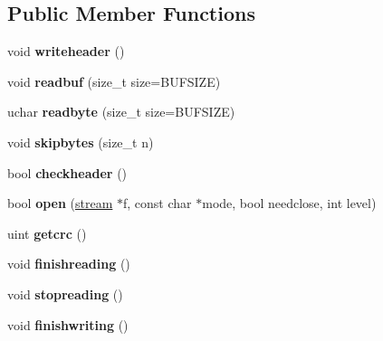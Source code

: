 \subsection*{Public Member Functions}
\begin{DoxyCompactItemize}
\item 
\mbox{\label{structgzstream_a6d191853a1c4c8bf6cccbab9c8e0309a}} 
void {\bfseries writeheader} ()
\item 
\mbox{\label{structgzstream_a8d0344b10ddf5d5f027f845b25a5d7b7}} 
void {\bfseries readbuf} (size\+\_\+t size=B\+U\+F\+S\+I\+ZE)
\item 
\mbox{\label{structgzstream_a4da22015c7effe15411cec2f24dea196}} 
uchar {\bfseries readbyte} (size\+\_\+t size=B\+U\+F\+S\+I\+ZE)
\item 
\mbox{\label{structgzstream_a03650110ed9c2b4d0b055347fa2597c9}} 
void {\bfseries skipbytes} (size\+\_\+t n)
\item 
\mbox{\label{structgzstream_a68b93da33e4709a1fd002542a78fc944}} 
bool {\bfseries checkheader} ()
\item 
\mbox{\label{structgzstream_a68ed86a7e5317f5e78ab711792a03d2c}} 
bool {\bfseries open} (\hyperlink{structstream}{stream} $\ast$f, const char $\ast$mode, bool needclose, int level)
\item 
\mbox{\label{structgzstream_a1dbc14c5f33576998da060e4deb20d61}} 
uint {\bfseries getcrc} ()
\item 
\mbox{\label{structgzstream_a256c3b94fc42c95c6ee3cc4723e5cb8f}} 
void {\bfseries finishreading} ()
\item 
\mbox{\label{structgzstream_a1c6cf7dae9e68e6572b506527d02bac3}} 
void {\bfseries stopreading} ()
\item 
\mbox{\label{structgzstream_a38f6ae18fdaa4745809c96fba06e0b33}} 
void {\bfseries finishwriting} ()
\item 
\mbox{\label{structgzstream_a51c351b6b6cb48ca2f0df3e116380d92}} 

\end{DoxyCompactItemize}
